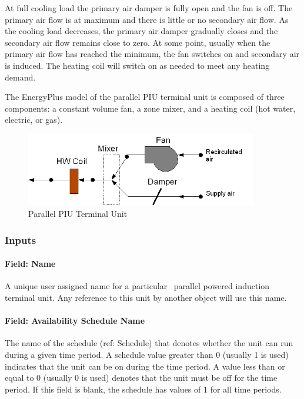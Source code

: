 At full cooling load the primary air damper is fully open and the fan is off. The primary air flow is at maximum and there is little or no secondary air flow. As the cooling load decreases, the primary air damper gradually closes and the secondary air flow remains close to zero. At some point, usually when the primary air flow has reached the minimum, the fan switches on and secondary air is induced. The heating coil will switch on as needed to meet any heating demand.

The EnergyPlus model of the parallel PIU terminal unit is composed of three components: a constant volume fan, a zone mixer, and a heating coil (hot water, electric, or gas).

\begin{figure}[hbtp] %
\centering
\includegraphics[width=0.9\textwidth, height=0.9\textheight, keepaspectratio=true]{media/image271.png}
\caption{Parallel PIU Terminal Unit \protect \label{fig:parallel-piu-terminal-unit}}
\end{figure}

\subsubsection{Inputs}\label{inputs-8-000}

\paragraph{Field: Name}\label{field-name-8-000}

A unique user assigned name for a particular~ parallel powered induction terminal unit. Any reference to this unit by another object will use this name.

\paragraph{Field: Availability Schedule Name}\label{field-availability-schedule-name-8}

The name of the schedule (ref: Schedule) that denotes whether the unit can run during a given time period. A schedule value greater than 0 (usually 1 is used) indicates that the unit can be on during the time period. A value less than or equal to 0 (usually 0 is used) denotes that the unit must be off for the time period. If this field is blank, the schedule has values of 1 for all time periods.

